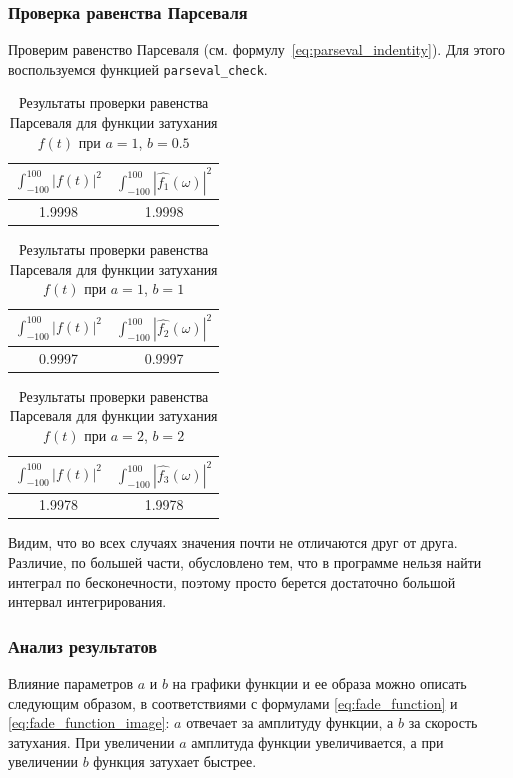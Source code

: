 \FloatBarrier
\subsubsection{Проверка равенства Парсеваля}
Проверим равенство Парсеваля (см. формулу~\eqref{eq:parseval_indentity}). Для этого воспользуемся функцией \texttt{parseval\_check}.
\begin{table}[ht!]
    \centering
    \begin{tabular}{|c|c|}
        \hline
        $\displaystyle\int_{-100}^{100}{|f(t)|^2}$ & $\displaystyle\int_{-100}^{100}{|\hat{f_1}(\omega)|^2}$ \\
        \hline
        1.9998 & 1.9998 \\
        \hline
    \end{tabular}
    \caption{Результаты проверки равенства Парсеваля для функции затухания $f(t)$ при $a = 1$, $b = 0.5$}
    \label{tab:fade_1_parseval_check}
\end{table}

\begin{table}[ht!]
    \centering
    \begin{tabular}{|c|c|}
        \hline
        $\displaystyle\int_{-100}^{100}{|f(t)|^2}$ & $\displaystyle\int_{-100}^{100}{|\hat{f_2}(\omega)|^2}$ \\
        \hline
        0.9997 & 0.9997 \\
        \hline
    \end{tabular}
    \caption{Результаты проверки равенства Парсеваля для функции затухания $f(t)$ при $a = 1$, $b = 1$}
    \label{tab:fade_2_parseval_check}
\end{table}

\begin{table}[ht!]
    \centering
    \begin{tabular}{|c|c|}
        \hline
        $\displaystyle\int_{-100}^{100}{|f(t)|^2}$ & $\displaystyle\int_{-100}^{100}{|\hat{f_3}(\omega)|^2}$ \\
        \hline
        1.9978 & 1.9978 \\
        \hline
    \end{tabular}
    \caption{Результаты проверки равенства Парсеваля для функции затухания $f(t)$ при $a = 2$, $b = 2$}
    \label{tab:fade3_parseval_check}
\end{table}

Видим, что во всех случаях значения почти не отличаются друг от друга. Различие, по большей части, обусловлено тем, что в программе нельзя найти интеграл по бесконечности, поэтому просто берется достаточно большой интервал интегрирования.

\subsubsection{Анализ результатов}
Влияние параметров $a$ и $b$ на графики функции и ее образа можно описать следующим образом, в соответствиями с формулами \eqref{eq:fade_function} и \eqref{eq:fade_function_image}: $a$ отвечает за амплитуду функции, а $b$ за скорость затухания. При увеличении $a$ амплитуда функции увеличивается, а при увеличении $b$ функция затухает быстрее. 
